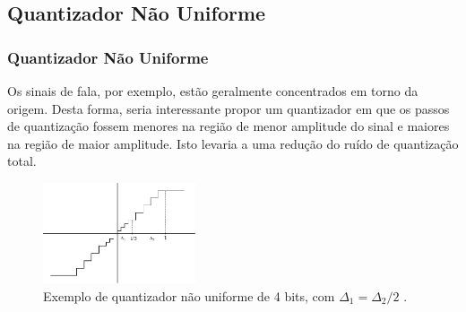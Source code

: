 \subsection{Quantizador Não Uniforme}
\begin{frame}%
  \frametitle{Quantizador Não Uniforme}

  Os sinais de fala, por exemplo, estão geralmente concentrados em torno da origem.
  Desta forma, seria interessante propor um quantizador em que os passos de quantização
  fossem menores na região de menor amplitude do sinal e maiores na região de maior amplitude.
  Isto levaria a uma redução do ruído de quantização total.

  \begin{figure}[h!]
  \centering
  \includegraphics[width=0.4\textwidth]{images/nuquantz.pdf}
  \caption{Exemplo de quantizador não uniforme de 4 bits, com $\Delta_1 = \Delta_2/2$ \citep{tokunbo}.}
  \label{fig:nuquantz}
  \end{figure}
\end{frame}

